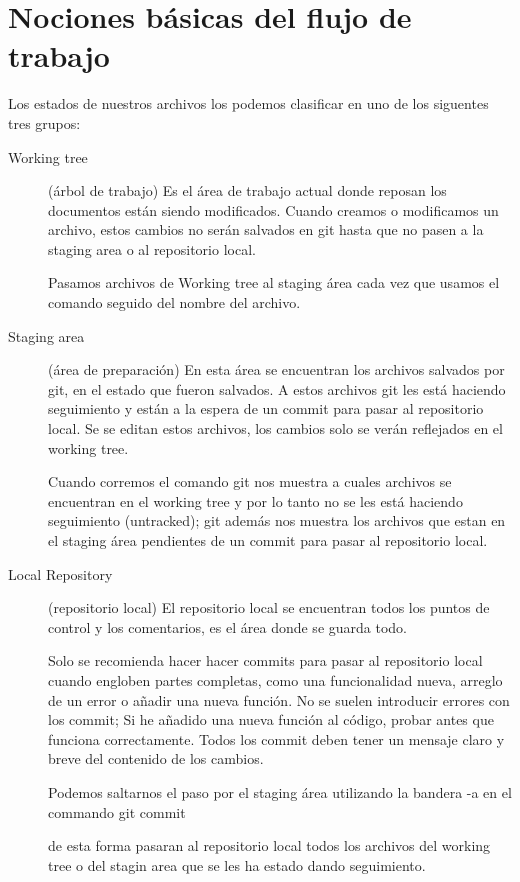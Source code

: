 \section{Nociones básicas del flujo de trabajo}

Los estados de nuestros archivos los podemos clasificar en uno de los siguentes 
tres grupos: 

\vspace{5 mm}
\begin{description}
 \item[Working tree] (árbol de trabajo) Es el área de trabajo actual donde reposan los documentos 
 están siendo modificados. Cuando creamos o modificamos un archivo, estos 
 cambios no serán salvados en git hasta que no pasen a la staging area o al 
 repositorio local.
 
 Pasamos archivos de Working tree al staging área cada vez que usamos el comando
 seguido del nombre del archivo.
 
\vspace{5 mm}
 \item[Staging area] (área de preparación) En esta área se encuentran los archivos salvados por git,
  en el estado que fueron salvados. A estos archivos git les está haciendo 
  seguimiento y están a la espera de un commit para pasar al repositorio local. 
  Se se editan estos archivos, los cambios solo se verán reflejados en el 
  working tree. 
 
  Cuando corremos el comando
  git nos muestra a cuales archivos se encuentran en el working tree y por lo 
  tanto no se les está haciendo seguimiento (untracked); git además nos muestra 
  los archivos que estan en el staging área pendientes de un commit para pasar 
  al repositorio local.
  
\vspace{5 mm}
 \item[Local Repository] (repositorio local)
  El repositorio local se encuentran todos los puntos de control y los 
  comentarios, es el área donde se guarda todo.
  
  Solo se recomienda hacer hacer commits para pasar al repositorio local cuando
  engloben partes completas, como una funcionalidad nueva, arreglo de un error o
  añadir una nueva función. No se suelen introducir errores con los commit;
  Si he añadido una nueva función al código, probar antes que funciona
  correctamente. Todos los commit deben tener un mensaje claro y breve del 
  contenido de los cambios.
  
  Podemos saltarnos el paso por el staging área utilizando la bandera -a en el 
  commando git commit
  
 
 de esta forma pasaran al repositorio local todos los archivos del working tree
  o del stagin area que se les ha estado dando seguimiento. 
  
\end{description}

